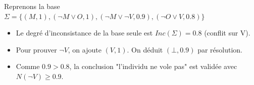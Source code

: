 \begin{example} 
    Reprenons la base $ \Sigma = \{(M, 1), (\lnot M \lor O, 1), (\lnot M \lor \lnot V, 0.9), (\lnot O \lor V, 0.8)\}$
    \begin{itemize} 
        \item Le degré d'inconsistance de la base seule est $Inc( \Sigma) = 0.8$ (conflit sur V). 
        \item Pour prouver $\lnot V$, on ajoute $(V,1)$. On déduit $(\bot,0.9)$ par résolution. 
        \item Comme $0.9 > 0.8$, la conclusion "l'individu ne vole pas" est validée avec $ N(\lnot V) \geqslant 0.9$. 
    \end{itemize}
\end{example}






